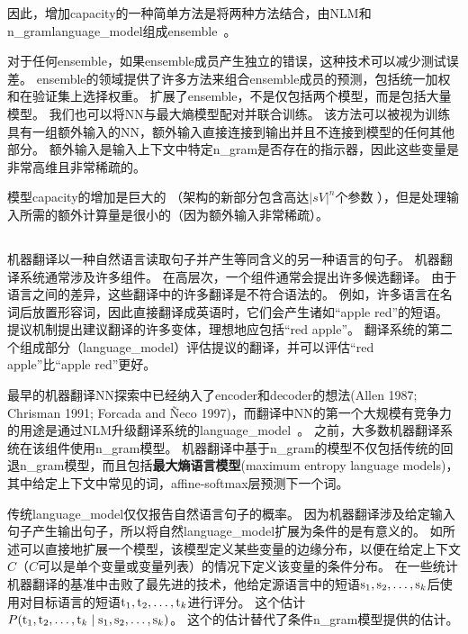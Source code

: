 因此，增加\gls{capacity}的一种简单方法是将两种方法结合，由\gls{NLM}和\gls{n_gram}\gls{language_model}组成\gls{ensemble}~\citep{BenDucVin01-small,Bengio-nnlm2003-small}。

对于任何\gls{ensemble}，如果\gls{ensemble}成员产生独立的错误，这种技术可以减少测试误差。
\gls{ensemble}的领域提供了许多方法来组合\gls{ensemble}成员的预测，包括统一加权和在验证集上选择权重。
\citet{Mikolov-Interspeech-2011} 扩展了\gls{ensemble}，不是仅包括两个模型，而是包括大量模型。
我们也可以将\gls{NN}与最大熵模型配对并联合训练\citep{Mikolov-ASRU-2011}。
该方法可以被视为训练具有一组额外输入的\gls{NN}，额外输入直接连接到输出并且不连接到模型的任何其他部分。
额外输入是输入上下文中特定\gls{n_gram}是否存在的指示器，因此这些变量是非常高维且非常稀疏的。

模型\gls{capacity}的增加是巨大的 （架构的新部分包含高达$| sV |^n$个参数 ），但是处理输入所需的额外计算量是很小的（因为额外输入非常稀疏）。

\subsection{}
\label{sec:neural_machine_translation}

机器翻译以一种自然语言读取句子并产生等同含义的另一种语言的句子。
机器翻译系统通常涉及许多组件。
在高层次，一个组件通常会提出许多候选翻译。
由于语言之间的差异，这些翻译中的许多翻译是不符合语法的。
例如，许多语言在名词后放置形容词，因此直接翻译成英语时，它们会产生诸如``apple red''的短语。
提议机制提出建议翻译的许多变体，理想地应包括``red apple''。
翻译系统的第二个组成部分（\gls{language_model}）评估提议的翻译，并可以评估``red apple''比``apple red''更好。


最早的机器翻译\gls{NN}探索中已经纳入了\gls{encoder}和\gls{decoder}的想法(Allen 1987; Chrisman 1991; Forcada
and Ñeco 1997)，而翻译中\gls{NN}的第一个大规模有竞争力的用途是通过\gls{NLM}升级翻译系统的\gls{language_model}~\citep{Schwenk-et-al-IWSLT2006,Schwenk-2010}。
之前，大多数机器翻译系统在该组件使用\gls{n_gram}模型。
机器翻译中基于\gls{n_gram}的模型不仅包括传统的回退\gls{n_gram}模型，而且包括\textbf{最大熵语言模型}(maximum entropy language models)，其中给定上下文中常见的词，affine-softmax层预测下一个词。

传统\gls{language_model}仅仅报告自然语言句子的概率。
因为机器翻译涉及给定输入句子产生输出句子，所以将自然\gls{language_model}扩展为条件的是有意义的。
如所述可以直接地扩展一个模型，该模型定义某些变量的边缘分布，以便在给定上下文$C$（$C$可以是单个变量或变量列表）的情况下定义该变量的条件分布。
\citet{Devlin-et-al-ACL2014}在一些统计机器翻译的基准中击败了最先进的技术，他给定源语言中的短语$\mathrm{s}_1, \mathrm{s}_2,\ldots, \mathrm{s}_k$后使用对目标语言的短语$\mathrm{t}_1, \mathrm{t}_2,\ldots, \mathrm{t}_k$进行评分。
这个估计$P(\mathrm{t}_1, \mathrm{t}_2,\ldots, \mathrm{t}_k \mid \mathrm{s}_1, \mathrm{s}_2,\ldots, \mathrm{s}_k)$。
这个的估计替代了条件\gls{n_gram}模型提供的估计。

